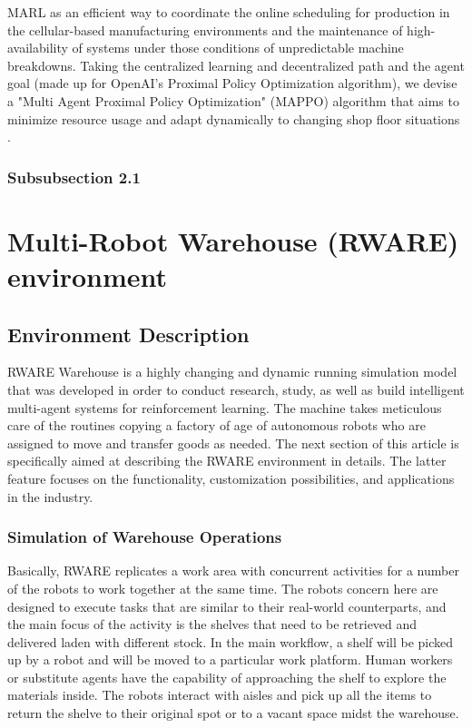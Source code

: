 \documentclass[11pt]{article}
\begin{document}
MARL as an efficient way to coordinate the online scheduling for production in the cellular-based manufacturing environments and the maintenance of high-availability of systems under those conditions of unpredictable machine breakdowns. Taking the centralized learning and decentralized path and the agent goal (made up for OpenAI’s Proximal Policy Optimization algorithm), we devise a "Multi Agent Proximal Policy Optimization" (MAPPO) algorithm that aims to minimize resource usage and adapt dynamically to changing shop floor situations \cite{lohse2021implementing}.










\blindtext

\subsubsection{Subsubsection 2.1}

\section{Multi-Robot Warehouse (RWARE) environment}
\subsection{Environment Description}
RWARE Warehouse is a highly changing and dynamic running simulation model that was developed in order to conduct research, study, as well as build intelligent multi-agent systems for reinforcement learning. The machine takes meticulous care of the routines copying a factory of age of autonomous robots who are assigned to move and transfer goods as needed. The next section of this article is specifically aimed at describing the RWARE environment in details. The latter feature focuses on the functionality, customization possibilities, and applications in the industry.

\subsubsection{Simulation of Warehouse Operations}
Basically, RWARE replicates a work area with concurrent activities for a number of the robots to work together at the same time. The robots concern here are designed to execute tasks that are similar to their real-world counterparts, and the main focus of the activity is the shelves that need to be retrieved and delivered laden with different stock. In the main workflow, a shelf will be picked up by a robot and will be moved to a particular work platform. Human workers or substitute agents have the capability of approaching the shelf to explore the materials inside. The robots interact with aisles and pick up all the items to return the shelve to their original spot or to a vacant space midst the warehouse.
\end{document}
